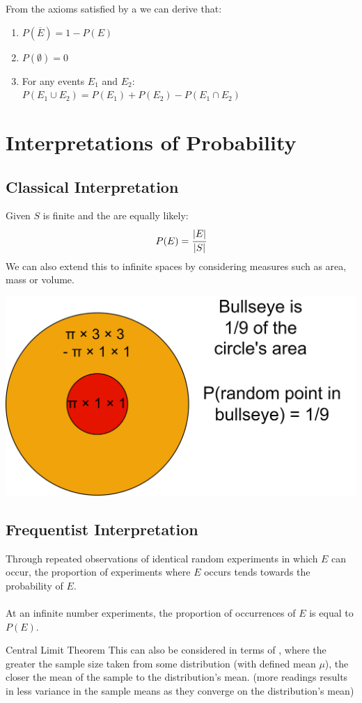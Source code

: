 From the axioms satisfied by a  we can derive that:
\begin{enumerate}
    \item $P(\overline{E}) = 1 - P(E)$
    \item $P(\emptyset) = 0$
    \item For any events $E_1$ and $E_2$: $P(E_1 \cup E_2) = P(E_1) + P(E_2) - P(E_1 \cap E_2)$
\end{enumerate}

\section{Interpretations of Probability}
\subsection{Classical Interpretation}

Given $S$ is finite and the  are equally likely:
\[P(E) = \cfrac{|E|}{|S|}\]
We can also extend this  to infinite spaces by considering measures such as area, mass or volume.
\begin{center}
    \includegraphics[width=.5\textwidth]{elementary_probability_theory/images/uniform area.drawio.png}
\end{center}

\subsection{Frequentist Interpretation}
Through repeated observations of identical random experiments in which $E$ can occur, the proportion of experiments where $E$ occurs tends towards the probability of $E$.
\\
\\ At an infinite number experiments, the proportion of occurrences of $E$ is equal to $P(E)$.
\begin{sidenotebox}{Central Limit Theorem}
	This can also be considered in terms of , where the greater the sample size taken from some distribution (with defined mean $\mu$), the closer the mean of the sample to the distribution's mean. (more readings results in less variance in the sample means as they converge on the distribution's mean)
\end{sidenotebox}


